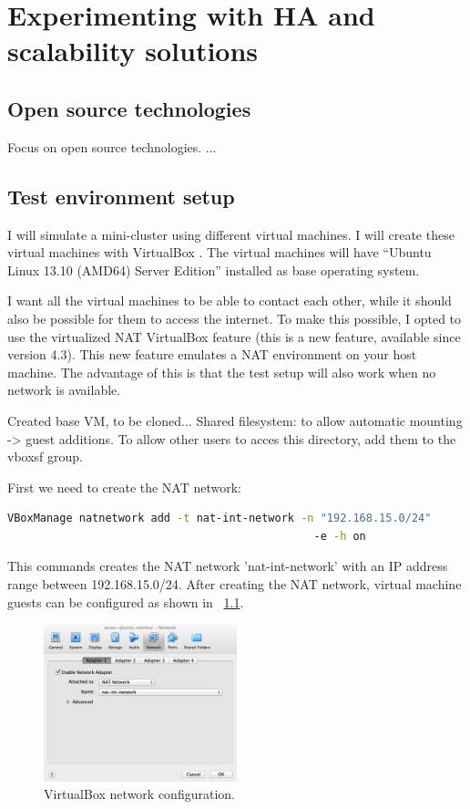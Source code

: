 \documentclass[12pt]{report}
\begin{document}
\chapter{Experimenting with HA and scalability solutions}
\section{Open source technologies}
Focus on open source technologies. ... 

\section{Test environment setup}
I will simulate a mini-cluster using different virtual machines. I
will create these virtual machines with VirtualBox
\cite{virtualbox_soft:2013}.  The virtual machines will have
``Ubuntu Linux 13.10 (AMD64) Server Edition''
\cite{ubuntu_server_13_10:2013} installed as base operating system.

I want all the virtual machines to be able to contact each other,
while it should also be possible for them to access
the internet.
To make this possible, I opted to use the virtualized NAT
VirtualBox feature (this is a new feature, available since version
4.3).
This new feature emulates a NAT environment on your host machine.
The advantage of this is that the test setup will also work when no
network is available.

Created base VM, to be cloned...
Shared filesystem: to allow automatic mounting -> guest additions.
To allow other users to acces this directory, add them to the vboxsf group.


\noindent First we need to create the NAT network:
\begin{lstlisting}[language=bash]
 VBoxManage natnetwork add -t nat-int-network -n "192.168.15.0/24"
                                               -e -h on
\end{lstlisting}
This commands creates the NAT network 'nat-int-network' with an IP
address range between 192.168.15.0/24.
After creating the NAT network, virtual machine guests can be
configured as shown in ~\cref{fig:vbox_network_config}.
\begin{figure}[h!]
  \caption{VirtualBox network configuration.}
  \label{fig:vbox_network_config}
  \centering
    \includegraphics[width=0.5\textwidth]{pics/vbox_network_config.png}
\end{figure}
\end{document}
